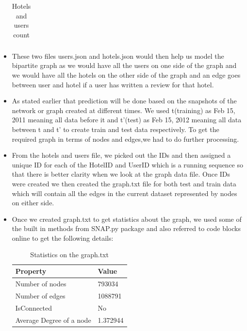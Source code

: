 \documentclass[letterpaper,twocolumn,11pt]{article}
\begin{document}
\begin{itemize}
\begin{table}[h]
\begin{tabular}{ |p{3cm}|p{3cm} |}
	\end{tabular}
	\caption{Hotels and users count} 
	\label{tab:dist1} 
\end{table} 

\item These two files users.json and hotels.json would then help us model the bipartite graph as we would have all the users on one side of the graph and we would have all the hotels on the other side of the graph and an edge goes between user and hotel if a user has written a review  for that hotel.

\item As stated earlier that prediction will be done based on the snapshots of the network or graph created at different times. We used t(training) as Feb 15, 2011 meaning all data before it and t'(test) as Feb 15, 2012  meaning all data between t and t' to create train and test data respectively. To get the required graph in terms of nodes and edges,we had to do further processing.

\item From the hotels and users file, we picked out the IDs and then assigned a unique ID for each of the HotelID and UserID which is a running sequence so that there is better clarity when we look at the graph data file. Once IDs were created we then created the graph.txt file for both test and train data which will contain all the edges in the current dataset represented by nodes on either side.
\item Once we created graph.txt to get statistics about the graph, we used some of the built in methods from SNAP.py package and also referred to code blocks online to get the following details:
\begin{table}[ht]
	\begin{tabular}{ |p{5cm}|p{2cm} |}
		\hline
		\textbf {Property} & \textbf{Value}\\ \hline
		Number of nodes	&	793034 \\  \hline
		Number of edges	&	1088791 \\  \hline
		IsConnected	&	No \\  \hline
		Average Degree of a node		&	1.372944\\  \hline

		
	\end{tabular}
	\caption{Statistics on the graph.txt} 
	\label{tab:dist} 
\end{table} 

\end{itemize}
\end{document}
